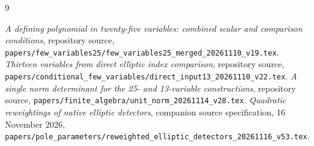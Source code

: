 \documentclass[11pt,a4paper]{article}
\begin{document}
\begin{thebibliography}{9}
\raggedright
{}
\emph{A defining polynomial in twenty-five variables: combined scalar
and comparison conditions}, repository source,
\nolinkurl{papers/few_variables25/few_variables25_merged_20261110_v19.tex}.
\emph{Thirteen variables from direct elliptic index comparison},
repository source,
\nolinkurl{papers/conditional_few_variables/direct_input13_20261110_v22.tex}.
\emph{A single norm determinant for the 25- and 13-variable constructions},
repository source,
\nolinkurl{papers/finite_algebra/unit_norm_20261114_v28.tex}.
\emph{Quadratic reweightings of native elliptic detectors},
companion source specification, 16 November 2026,
\nolinkurl{papers/pole_parameters/reweighted_elliptic_detectors_20261116_v53.tex}.
\end{thebibliography}
\end{document}
